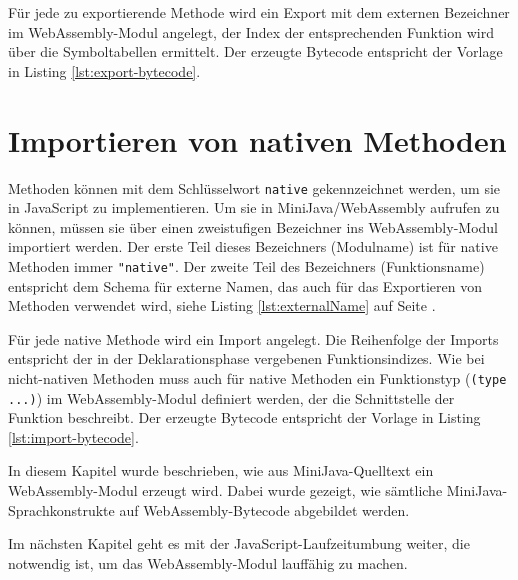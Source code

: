Für jede zu exportierende Methode wird ein Export mit dem externen Bezeichner im WebAssembly-Modul angelegt, der Index der entsprechenden Funktion wird über die Symboltabellen ermittelt. Der erzeugte Bytecode entspricht der Vorlage in Listing \ref{lst:export-bytecode}.



\section{Importieren von nativen Methoden}

Methoden können mit dem Schlüsselwort \lstinline{native} gekennzeichnet werden, um sie in JavaScript zu implementieren. Um sie in MiniJava/WebAssembly aufrufen zu können, müssen sie über einen zweistufigen Bezeichner ins WebAssembly-Modul importiert werden. Der erste Teil dieses Bezeichners (Modulname) ist für native Methoden immer \lstinline{"native"}. Der zweite Teil des Bezeichners (Funktionsname) entspricht dem Schema für externe Namen, das auch für das Exportieren von Methoden verwendet wird, siehe Listing \ref{lst:externalName} auf Seite \pageref{lst:externalName}.

Für jede native Methode wird ein Import angelegt. Die Reihenfolge der Imports entspricht der in der Deklarationsphase vergebenen Funktionsindizes. Wie bei nicht-nativen Methoden muss auch für native Methoden ein Funktionstyp (\lstinline{(type ...)}) im Web\-As\-sem\-bly-Mo\-dul definiert werden, der die Schnittstelle der Funktion beschreibt. Der erzeugte Bytecode entspricht der Vorlage in Listing \ref{lst:import-bytecode}.



\vspace{4em}
In diesem Kapitel wurde beschrieben, wie aus MiniJava-Quelltext ein WebAssembly-Modul erzeugt wird. Dabei wurde gezeigt, wie sämtliche MiniJava-Sprachkonstrukte auf WebAssembly-Bytecode abgebildet werden.

Im nächsten Kapitel geht es mit der JavaScript-Laufzeitumbung weiter, die notwendig ist, um das WebAssembly-Modul lauffähig zu machen.

